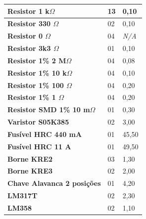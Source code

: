 \begin{table}[!ht]
\begin{tabular}{|l|l|l|}
        \textbf{Resistor 1 k$\Omega$}          & 13                  & 0,10                             \\ \hline
        \textbf{Resistor 330 $\Omega$}         & 02                  & 0,10                             \\ \hline
        \textbf{Resistor 0 $\Omega$}           & 04                  & \textit{N/A}                     \\ \hline
        \textbf{Resistor 3k3 $\Omega$}         & 01                  & 0,10                             \\ \hline
        \textbf{Resistor 1\% 2 M$\Omega$}      & 04                  & 0,08                             \\ \hline
        \textbf{Resistor 1\% 10 k$\Omega$}     & 04                  & 0,10                             \\ \hline
        \textbf{Resistor 1\% 100 $\Omega$}     & 04                  & 0,20                             \\ \hline
        \textbf{Resistor 1\% 1 $\Omega$}       & 04                  & 0,20                             \\ \hline
        \textbf{Resistor SMD 1\% 10 m$\Omega$} & 01                  & 0,30                             \\ \hline
        \textbf{Varistor S05K385}              & 02                  & 3,00                             \\ \hline
        \textbf{Fusível HRC 440 mA}            & 01                  & 45,50                            \\ \hline
        \textbf{Fusível HRC 11 A}              & 01                  & 49,50                            \\ \hline
        \textbf{Borne KRE2}                    & 03                  & 1,30                             \\ \hline
        \textbf{Borne KRE3}                    & 02                  & 2,00                             \\ \hline
        \textbf{Chave Alavanca 2 posições}     & 01                  & 4,20                             \\ \hline
        \textbf{LM317T}                        & 02                  & 2,30                             \\ \hline
        \textbf{LM358}                         & 02                  & 1,10                             \\ \hline

\end{tabular}
\end{table}
